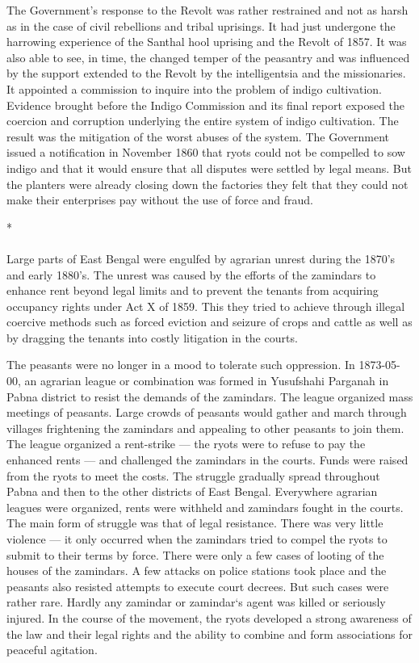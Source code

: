 \begin{multicols}{2}
The Government's response to the Revolt was rather restrained and not as harsh as in the case of civil rebellions and tribal uprisings. It had just undergone the harrowing experience of the Santhal hool uprising and the Revolt of 1857. It was also able to see, in time, the changed temper of the peasantry and was influenced by the support extended to the Revolt by the intelligentsia and the missionaries. It appointed a commission to inquire into the problem of indigo cultivation. Evidence brought before the Indigo Commission and its final report exposed the coercion and corruption underlying the entire system of indigo cultivation. The result was the mitigation of the worst abuses of the system. The Government issued a notification in November 1860 that ryots could not be compelled to sow indigo and that it would ensure that all disputes were settled by legal means. But the planters were already closing down the factories they felt that they could not make their enterprises pay without the use of force and fraud.

\begin{center}*\end{center}

\paragraph*{}
Large parts of East Bengal were engulfed by agrarian unrest during the 1870's and early 1880's. The unrest was caused by the efforts of the zamindars to enhance rent beyond legal limits and to prevent the tenants from acquiring occupancy rights under Act X of 1859. This they tried to achieve through illegal coercive methods such as forced eviction and seizure of crops and cattle as well as by dragging the tenants into costly litigation in the courts.

The peasants were no longer in a mood to tolerate such oppression. In 1873-05-00, an agrarian league or combination was formed in Yusufshahi Parganah in Pabna district to resist the demands of the zamindars. The league organized mass meetings of peasants. Large crowds of peasants would gather and march through villages frightening the zamindars and appealing to other peasants to join them. The league organized a rent-strike --- the ryots were to refuse to pay the enhanced rents --- and challenged the zamindars in the courts. Funds were raised from the ryots to meet the costs. The struggle gradually spread throughout Pabna and then to the other districts of East Bengal. Everywhere agrarian leagues were organized, rents were withheld and zamindars fought in the courts. The main form of struggle was that of legal resistance. There was very little violence --- it only occurred when the zamindars tried to compel the ryots to submit to their terms by force. There were only a few cases of looting of the houses of the zamindars. A few attacks on police stations took place and the peasants also resisted attempts to execute court decrees. But such cases were rather rare. Hardly any zamindar or zamindar`s agent was killed or seriously injured. In the course of the movement, the ryots developed a strong awareness of the law and their legal rights and the ability to combine and form associations for peaceful agitation.


\end{multicols}

